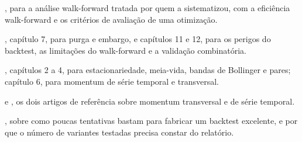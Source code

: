 \begin{leituras}
  \item \citet{pardo2008}, para a análise walk-forward tratada por quem a sistematizou, com a eficiência walk-forward e os critérios de avaliação de uma otimização.
  \item \citet{lopezdeprado2018}, capítulo 7, para purga e embargo, e capítulos 11 e 12, para os perigos do backtest, as limitações do walk-forward e a validação combinatória.
  \item \citet{chan2013}, capítulos 2 a 4, para estacionariedade, meia-vida, bandas de Bollinger e pares; capítulo 6, para momentum de série temporal e transversal.
  \item \citet{jegadeesh1993} e \citet{moskowitz2012}, os dois artigos de referência sobre momentum transversal e de série temporal.
  \item \citet{bailey2014pseudo}, sobre como poucas tentativas bastam para fabricar um backtest excelente, e por que o número de variantes testadas precisa constar do relatório.
\end{leituras}
